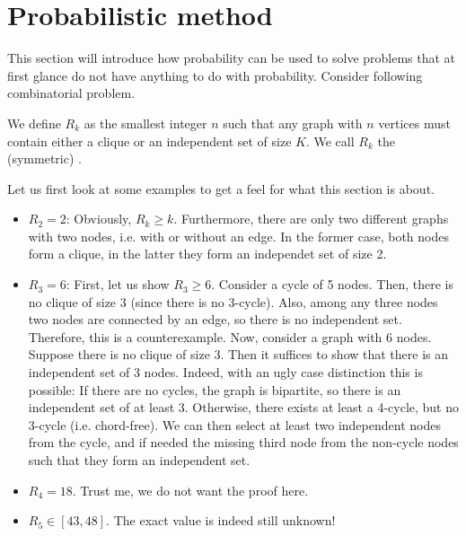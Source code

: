 
\section{Probabilistic method}
This section will introduce how probability can be used to solve problems that at first glance do not have anything to do with probability.
Consider following combinatorial problem.
\begin{definition}
    We define $R_k$ as the smallest integer $n$ such that any graph with $n$ vertices must contain either a clique or an independent set of size $K$.
    We call $R_k$ the (symmetric) .
\end{definition}
Let us first look at some examples to get a feel for what this section is about.
\begin{example}
    \begin{itemize}
        The first few Ramsay numbers are given as
        \item $R_2=2$: Obviously, $R_k \geq k$. Furthermore, there are only two different graphs with two nodes, i.e. with or without an edge.
              In the former case, both nodes form a clique, in the latter they form an independet set of size 2.
        \item $R_3=6$: First, let us show $R_3 \geq 6$. Consider a cycle of 5 nodes. Then, there is no clique of size 3 (since there is no 3-cycle).
              Also, among any three nodes two nodes are connected by an edge, so there is no independent set. Therefore, this is a counterexample.
              Now, consider a graph with 6 nodes. Suppose there is no clique of size 3. Then it suffices to show that there is an independent set of 3 nodes.
              Indeed, with an ugly case distinction this is possible: If there are no cycles, the graph is bipartite, so there is an independent set of at least 3.
              Otherwise, there exists at least a 4-cycle, but no 3-cycle (i.e. chord-free).
              We can then select at least two independent nodes from the cycle, and if needed the missing third node from the non-cycle nodes such that they form an independent set.
        \item $R_4 = 18$. Trust me, we do not want the proof here.
        \item $R_5 \in [43, 48]$. The exact value is indeed still unknown!
    \end{itemize}
\end{example}
